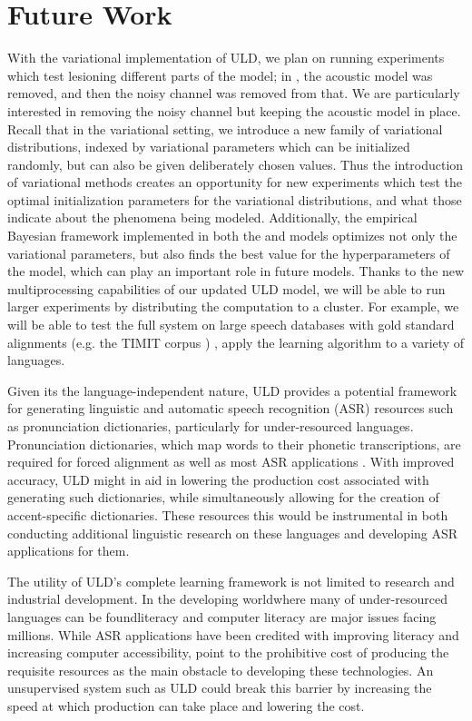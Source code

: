 \documentclass[12pt,letterpaper]{article}
\begin{document}
\section{Future Work}
With the variational implementation of ULD, we plan on running experiments which test lesioning different parts of the model; in \citet{lee:2015}, the acoustic model was removed, and then the noisy channel was removed from that. We are particularly interested in removing the noisy channel but keeping the acoustic model in place. Recall that in the variational setting, we introduce a new family of variational distributions, indexed by variational parameters which can be initialized randomly, but can also be given deliberately chosen values. Thus the introduction of variational methods creates an opportunity for new experiments which test the optimal initialization parameters for the variational distributions, and what those indicate about the phenomena being modeled. Additionally, the empirical Bayesian framework implemented in both the \citet{zhai:2014} and \citet{ondel:2016} models optimizes not only the variational parameters, but also finds the best value for the hyperparameters of the model, which can play an important role in future models. Thanks to the new multiprocessing capabilities of our updated ULD model, we will be able to run larger experiments by distributing the computation to a cluster. For example, we will be able to test the full system on large speech databases with gold standard alignments (e.g. the TIMIT corpus \citep{timit}) , apply the learning algorithm to a variety of languages. 

Given its the language-independent nature, ULD provides a potential framework for generating linguistic and automatic speech recognition (ASR) resources such as pronunciation dictionaries, particularly for under-resourced languages. Pronunciation dictionaries, which map words to their phonetic transcriptions, are required for forced alignment as well as most ASR applications \citep{besacier:2014}. With improved accuracy, ULD might in aid in lowering the production cost associated with generating such dictionaries, while simultaneously allowing for the creation of accent-specific dictionaries. These resources this would be instrumental in both conducting additional linguistic research on these languages and developing ASR applications for them. 

The utility of ULD's complete learning framework is not limited to research and industrial development. In the developing world\textemdash where many of under-resourced languages can be found\textemdash literacy and computer literacy are major issues facing millions. While ASR applications have been credited with improving literacy \citep{adams:2005} and increasing computer accessibility, \citet{plauche:2006} point to the prohibitive cost of producing the requisite resources as the main obstacle to developing these technologies. An unsupervised system such as ULD could break this barrier by increasing the speed at which production can take place and lowering the cost. 
\end{document}
